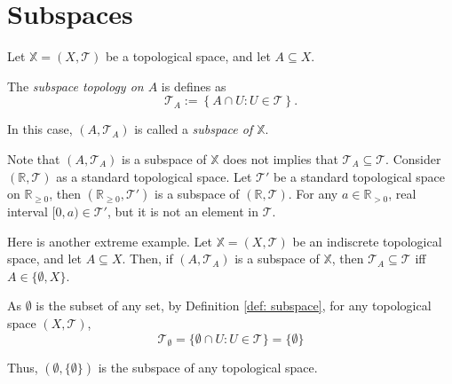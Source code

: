 \section{Subspaces}


\begin{definition}
	\label{def: subspace}
	Let $\mathbb X = (X, \mathcal T)$ be a topological space, and let $A \subseteq X$.
	
	The \textit{subspace topology on $A$} is defines as
	$$
	\mathcal T_A := \left\{ A \cap U : U \in \mathcal T \right\}.
	$$
	
	In this case, $(A, \mathcal T_A)$ is called a \textit{subspace of $\mathbb X$}.
\end{definition}


\begin{note}
	Note that $(A, \mathcal T_A)$ is a subspace of $\mathbb X$ does not implies that $\mathcal T_A \subseteq \mathcal T$. Consider $(\mathbb R, \mathcal T)$ as a standard topological space. Let $\mathcal T'$ be a standard topological space on $\mathbb R_{\ge 0}$, then $(\mathbb R_{\ge 0}, \mathcal T')$ is a subspace of $(\mathbb R, \mathcal T)$. For any $a \in \mathbb R_{> 0}$, real interval $[0, a) \in \mathcal T'$, but it is not an element in $\mathcal T$.
	
	Here is another extreme example. Let $\mathbb X = (X, \mathcal T)$ be an indiscrete topological space, and let $A \subseteq X$. Then, if $(A, \mathcal T_A)$ is a subspace of $\mathbb X$, then $\mathcal T_A \subseteq \mathcal T$ iff $A \in \{\emptyset, X \}$.
\end{note}


\begin{note}
	As $\emptyset$ is the subset of any set, by Definition \ref{def: subspace}, for any topological space $(X, \mathcal T)$,
	$$
	\mathcal T_\emptyset = \{\emptyset \cap U : U \in \mathcal T\} = \{\emptyset\}
	$$
	
	Thus, $(\emptyset, \{\emptyset\})$ is the subspace of any topological space.
\end{note}



